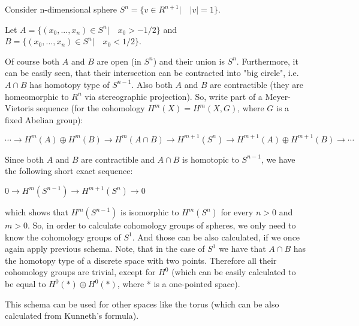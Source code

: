 \documentclass[12pt]{article}
\begin{document}
Consider n-dimensional sphere $S^n = \{v\in R^{n+1}| \quad |v|=1\}$.

Let $A = \{ (x_0,...,x_n)\in S^n| \quad x_0>-1/2 \}$ and
$B = \{ (x_0,...,x_n)\in S^n| \quad x_0<1/2 \}$.

Of course both $A$ and $B$ are open (in $S^n$) and their union is $S^n$. Furthermore, it can be easily seen, that their intersection can be contracted into "big circle", i.e. $A\cap B$ has homotopy type of $S^{n-1}$. Also both $A$ and $B$ are contractible (they are  homeomorphic to $R^n$ via stereographic projection). So, write part of a Meyer-Vietoris sequence (for the cohomology $H^m(X)=H^m(X,G)$, where $G$ is a fixed Abelian group):

$\cdots \rightarrow H^m(A) \oplus H^m(B) \rightarrow H^m(A\cap B)\rightarrow H^{m+1}(S^n)\rightarrow H^{m+1}(A) \oplus H^{m+1}(B)\rightarrow \cdots$

Since both $A$ and $B$ are contractible and $A\cap B$ is homotopic to $S^{n-1}$,  we have the following short exact sequence:

$0 \rightarrow H^m(S^{n-1}) \rightarrow  H^{m+1}(S^n) \rightarrow  0$

which shows that $H^m(S^{n-1})$ is isomorphic to $H^m(S^n)$ for every  $n>0$ and $m>0$. So, in order to calculate cohomology groups of spheres, we only need to know the cohomology groups  of $S^1$. And those can be also calculated, if we once again apply previous schema. Note, that in the case of $S^1$ we have that $A\cap B$ has the homotopy type of a discrete space with two points. Therefore all their cohomology groups are trivial, except for $H^0$ (which can be easily calculated to be equal to $H^0(*) \oplus H^0(*)$, where * is a one-pointed space). 

This schema can be used for other spaces like the torus (which can be also calculated from Kunneth's formula).
\end{document}

